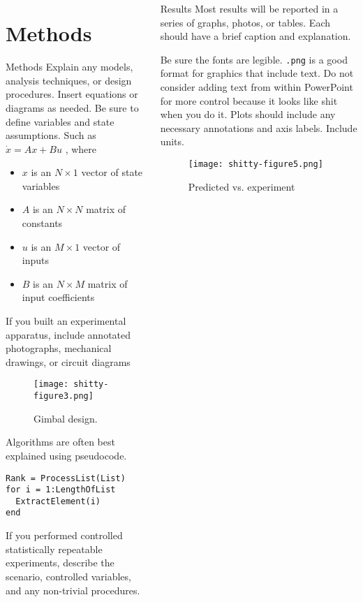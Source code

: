 \documentclass[pdf]{beamer}
\begin{document}
\begin{frame}[fragile]
\begin{columns}
\begin{column}{0.25\textwidth}
\section{Methods}
\begin{block}{Methods}
Explain any models, analysis techniques, or design procedures. Insert equations or diagrams as needed.  Be sure to define variables and state assumptions.  Such as $\dot{x} = Ax+Bu$ , where
\begin{itemize}
\item $x$ is an $N \times 1$ vector of state variables
\item $A$ is an $N \times N$ matrix of constants
\item $u$ is an $M \times 1$ vector of inputs
\item $B$ is an $N \times M$ matrix of input coefficients
\end{itemize}

If you built an experimental apparatus, include annotated photographs,  mechanical drawings, or circuit diagrams
\begin{figure}
\texttt{[image: shitty-figure3.png]}
\caption{Gimbal design.}
\end{figure}

Algorithms are often best explained using pseudocode.
\begin{lstlisting}[style=usnaMatlab]
Rank = ProcessList(List)
for i = 1:LengthOfList
  ExtractElement(i)
end
\end{lstlisting}

If you performed controlled statistically repeatable experiments, describe the scenario, controlled variables, and any non-trivial procedures. 
\end{block}
\end{column}

\begin{column}{0.25\textwidth}
\begin{block}{Results}
Most results will be reported in a series of graphs, photos, or tables.   Each should have a brief caption and explanation. 

Be sure the fonts are legible.  \lstinline{.png} is a good format for graphics that include text. Do not consider adding text from within PowerPoint for more control because it looks like shit when you do it.  Plots should include any necessary annotations and axis labels. Include units.
\begin{figure}
\texttt{[image: shitty-figure5.png]}
\caption{Predicted vs. experiment}
\end{figure} 


\end{block}
\end{column}
\end{columns}
\end{frame}
\end{document}
